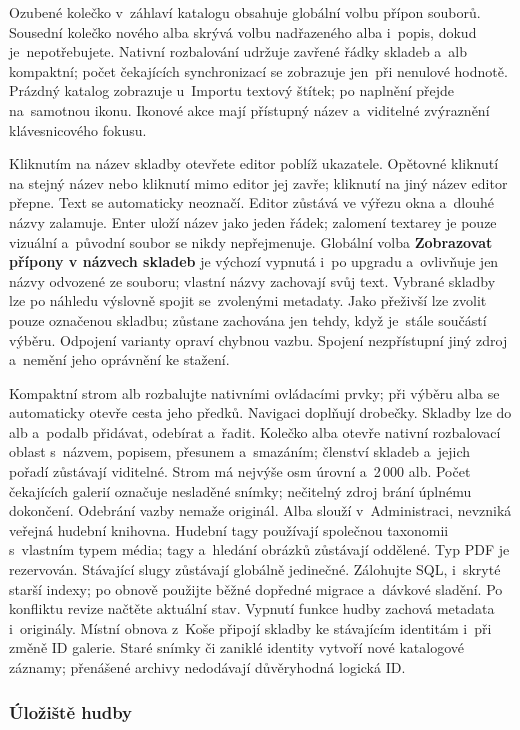 \documentclass[11pt,a4paper]{article}
\newcommand{\filepath}[1]{\path{#1}}
\newcommand{\ui}[1]{\textbf{#1}}
\begin{document}
Ozubené kolečko v~záhlaví katalogu obsahuje globální volbu přípon souborů.
Sousední kolečko nového alba skrývá volbu nadřazeného alba i~popis, dokud
je~nepotřebujete.
Nativní rozbalování udržuje zavřené řádky skladeb a~alb kompaktní; počet
čekajících synchronizací se zobrazuje jen~při nenulové hodnotě. Prázdný katalog
zobrazuje u~Importu textový štítek; po naplnění přejde na~samotnou ikonu.
Ikonové akce mají přístupný název a~viditelné zvýraznění klávesnicového fokusu.

Kliknutím na název skladby otevřete editor poblíž ukazatele. Opětovné kliknutí
na stejný název nebo kliknutí mimo editor jej zavře; kliknutí na jiný název
editor přepne. Text se automaticky neoznačí. Editor zůstává ve výřezu okna
a~dlouhé
názvy zalamuje. Enter uloží název jako jeden řádek; zalomení textarey je pouze
vizuální a~původní soubor se nikdy nepřejmenuje. Globální volba
\ui{Zobrazovat přípony v názvech skladeb} je výchozí vypnutá i~po upgradu
a~ovlivňuje jen názvy odvozené ze souboru; vlastní názvy zachovají svůj text.
Vybrané skladby lze po náhledu výslovně spojit se~zvolenými metadaty.
Jako přeživší lze zvolit pouze označenou skladbu; zůstane zachována jen tehdy,
když je~stále součástí výběru.
Odpojení varianty opraví chybnou vazbu. Spojení nezpřístupní jiný zdroj
a~nemění jeho oprávnění ke stažení.

Kompaktní strom alb rozbalujte nativními ovládacími prvky; při výběru alba se
automaticky otevře cesta jeho předků. Navigaci doplňují drobečky. Skladby lze
do alb a~podalb přidávat, odebírat a~řadit. Kolečko alba otevře nativní
rozbalovací oblast s~názvem, popisem, přesunem a~smazáním; členství skladeb
a~jejich pořadí zůstávají viditelné. Strom má nejvýše osm úrovní a~2\,000 alb.
Počet čekajících galerií označuje nesladěné snímky; nečitelný
zdroj brání úplnému dokončení.
Odebrání vazby nemaže originál. Alba slouží v~Administraci,
nevzniká veřejná hudební knihovna. Hudební tagy používají společnou taxonomii
s~vlastním typem média; tagy a~hledání obrázků zůstávají oddělené. Typ PDF
je rezervován. Stávající slugy zůstávají globálně jedinečné. Zálohujte SQL,
\filepath{data/music/} i~skryté starší indexy; po obnově použijte běžné
dopředné migrace a~dávkové sladění. Po konfliktu revize načtěte aktuální stav.
Vypnutí funkce hudby
zachová metadata i~originály.
Místní obnova z~Koše připojí skladby ke stávajícím identitám i~při změně ID
galerie. Staré snímky či zaniklé identity vytvoří nové katalogové záznamy;
přenášené archivy nedodávají důvěryhodná logická ID.

\subsubsection{Úložiště hudby}
\end{document}
